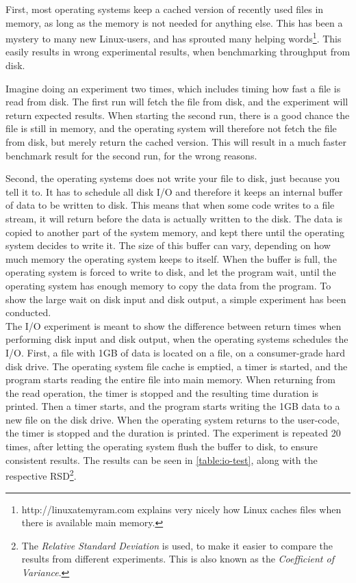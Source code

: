 \documentclass[a4paper]{article}
\begin{document}
First, most operating systems keep a cached version of recently used files in memory, as long as the memory is not needed for anything else. This has been a mystery to many new Linux-users, and has sprouted many helping words\footnote{http://linuxatemyram.com explains very nicely how Linux caches files when there is available main memory.}. This easily results in wrong experimental results, when benchmarking throughput from disk.

Imagine doing an experiment two times, which includes timing how fast a file is read from disk. The first run will fetch the file from disk, and the experiment will return expected results. When starting the second run, there is a good chance the file is still in memory, and the operating system will therefore not fetch the file from disk, but merely return the cached version. This will result in a much faster benchmark result for the second run, for the wrong reasons.

Second, the operating systems does not write your file to disk, just because you tell it to. It has to schedule all disk I/O and therefore it keeps an internal buffer of data to be written to disk. This means that when some code writes to a file stream, it will return before the data is actually written to the disk. The data is copied to another part of the system memory, and kept there until the operating system decides to write it. The size of this buffer can vary, depending on how much memory the operating system keeps to itself. When the buffer is full, the operating system is forced to write to disk, and let the program wait, until the operating system has enough memory to copy the data from the program. To show the large wait on disk input and disk output, a simple experiment has been conducted.\\

The I/O experiment is meant to show the difference between return times when performing disk input and disk output, when the operating systems schedules the I/O. First, a file with 1GB of data is located on a file, on a consumer-grade hard disk drive. The operating system file cache is emptied, a timer is started, and the program starts reading the entire file into main memory. When returning from the read operation, the timer is stopped and the resulting time duration is printed. Then a timer starts, and the program starts writing the 1GB data to a new file on the disk drive. When the operating system returns to the user-code, the timer is stopped and the duration is printed. The experiment is repeated 20 times, after letting the operating system flush the buffer to disk, to ensure consistent results. The results can be seen in \autoref{table:io-test}, along with the respective RSD\footnote{The \textit{Relative Standard Deviation} is used, to make it easier to compare the results from different experiments. This is also known as the \textit{Coefficient of Variance}.}.\\
\end{document}
